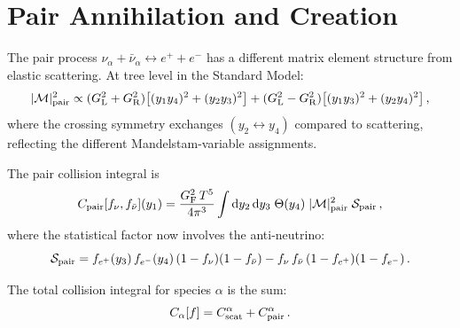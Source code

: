 \section{Pair Annihilation and Creation}\label{sec:pair}

The pair process $\nu_\alpha + \bar\nu_\alpha \leftrightarrow e^+ + e^-$ has a different matrix element structure from elastic scattering.  At tree level in the Standard Model:
\begin{equation}
|\mathcal{M}|^2_{\rm pair} \propto (G_{\rm L}^2 + G_{\rm R}^2)\bigl[(y_1 y_4)^2 + (y_2 y_3)^2\bigr] + (G_{\rm L}^2 - G_{\rm R}^2)\bigl[(y_1 y_3)^2 + (y_2 y_4)^2\bigr]\,,
\end{equation}
where the crossing symmetry exchanges $(y_2 \leftrightarrow y_4)$ compared to scattering, reflecting the different Mandelstam-variable assignments.

The pair collision integral is
\begin{equation}
C_{\rm pair}[f_\nu, f_{\bar\nu}](y_1) = \frac{G_{\rm F}^2\,T^5}{4\pi^3}\int \mathrm{d} y_2\,\mathrm{d} y_3\;\Theta(y_4)\;|\mathcal{M}|^2_{\rm pair}\;\mathcal{S}_{\rm pair}\,,
\end{equation}
where the statistical factor now involves the anti-neutrino:
\begin{equation}
\mathcal{S}_{\rm pair} = f_{e^+}(y_3)\,f_{e^-}(y_4)\,(1-f_\nu)(1-f_{\bar\nu}) - f_\nu\,f_{\bar\nu}\,(1-f_{e^+})(1-f_{e^-})\,.
\end{equation}

The total collision integral for species $\alpha$ is the sum:
\begin{equation}
C_\alpha[f] = C_{\rm scat}^\alpha + C_{\rm pair}^\alpha\,.
\end{equation}

